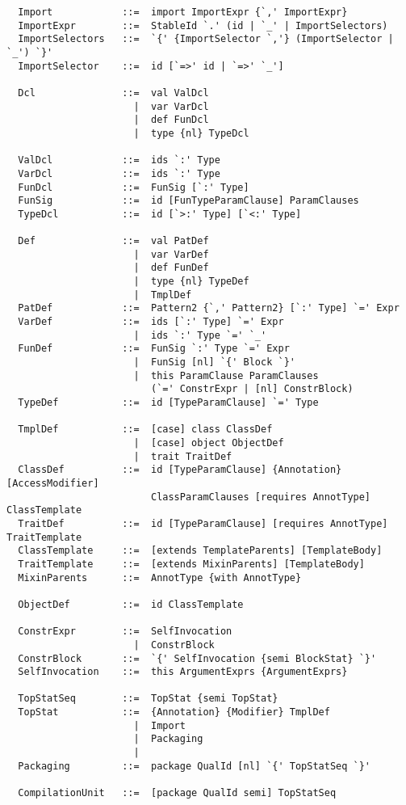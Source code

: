 {\begin{lstlisting}
  Import            ::=  import ImportExpr {`,' ImportExpr}
  ImportExpr        ::=  StableId `.' (id | `_' | ImportSelectors)
  ImportSelectors   ::=  `{' {ImportSelector `,'} (ImportSelector | `_') `}'
  ImportSelector    ::=  id [`=>' id | `=>' `_']

  Dcl               ::=  val ValDcl
                      |  var VarDcl
                      |  def FunDcl
                      |  type {nl} TypeDcl

  ValDcl            ::=  ids `:' Type
  VarDcl            ::=  ids `:' Type
  FunDcl            ::=  FunSig [`:' Type]
  FunSig            ::=  id [FunTypeParamClause] ParamClauses
  TypeDcl           ::=  id [`>:' Type] [`<:' Type]

  Def               ::=  val PatDef
                      |  var VarDef
                      |  def FunDef
                      |  type {nl} TypeDef
                      |  TmplDef
  PatDef            ::=  Pattern2 {`,' Pattern2} [`:' Type] `=' Expr
  VarDef            ::=  ids [`:' Type] `=' Expr
                      |  ids `:' Type `=' `_'
  FunDef            ::=  FunSig `:' Type `=' Expr
                      |  FunSig [nl] `{' Block `}'
                      |  this ParamClause ParamClauses 
                         (`=' ConstrExpr | [nl] ConstrBlock)
  TypeDef           ::=  id [TypeParamClause] `=' Type

  TmplDef           ::=  [case] class ClassDef
                      |  [case] object ObjectDef
                      |  trait TraitDef
  ClassDef          ::=  id [TypeParamClause] {Annotation} [AccessModifier] 
                         ClassParamClauses [requires AnnotType] ClassTemplate 
  TraitDef          ::=  id [TypeParamClause] [requires AnnotType] TraitTemplate
  ClassTemplate     ::=  [extends TemplateParents] [TemplateBody]
  TraitTemplate     ::=  [extends MixinParents] [TemplateBody]
  MixinParents      ::=  AnnotType {with AnnotType}
  
  ObjectDef         ::=  id ClassTemplate

  ConstrExpr        ::=  SelfInvocation 
                      |  ConstrBlock
  ConstrBlock       ::=  `{' SelfInvocation {semi BlockStat} `}'
  SelfInvocation    ::=  this ArgumentExprs {ArgumentExprs}

  TopStatSeq        ::=  TopStat {semi TopStat}
  TopStat           ::=  {Annotation} {Modifier} TmplDef
                      |  Import
                      |  Packaging
                      |
  Packaging         ::=  package QualId [nl] `{' TopStatSeq `}'

  CompilationUnit   ::=  [package QualId semi] TopStatSeq
\end{lstlisting}
}

